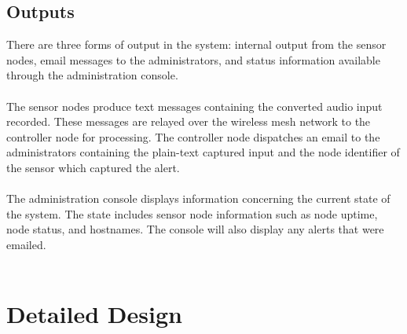 \documentclass[11pt,a4paper]{article}
\begin{document}
\subsection{Outputs}
There are three forms of output in the system: internal output from the sensor nodes, email messages to the administrators, and status information available through the administration console. \\\\
The sensor nodes produce text messages containing the converted audio input recorded.  These messages are relayed over the wireless mesh network to the controller node for processing.  The controller node dispatches an email to the administrators containing the plain-text captured input and the node identifier of the sensor which captured the alert. \\\\
The administration console displays information concerning the current state of the system.  The state includes sensor node information such as node uptime, node status, and hostnames.  The console will also display any alerts that were emailed.   \\\\

\section{Detailed Design}
\end{document}
